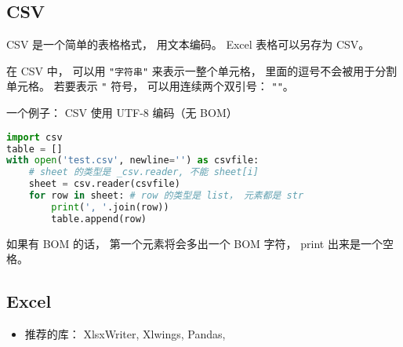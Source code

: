 
\begin{issues}
\issueDraft
\end{issues}


\subsection{CSV}
CSV 是一个简单的表格格式， 用文本编码。 Excel 表格可以另存为 CSV。

在 CSV 中， 可以用 \verb`"字符串"` 来表示一整个单元格， 里面的逗号不会被用于分割单元格。 若要表示 \verb`"` 符号， 可以用连续两个双引号： \verb`""`。

一个例子： CSV 使用 UTF-8 编码（无 BOM）
\begin{lstlisting}[language=python]
import csv
table = []
with open('test.csv', newline='') as csvfile:
    # sheet 的类型是 _csv.reader, 不能 sheet[i]
    sheet = csv.reader(csvfile)
    for row in sheet: # row 的类型是 list， 元素都是 str
        print(', '.join(row))
        table.append(row)
\end{lstlisting}
如果有 BOM 的话， 第一个元素将会多出一个 BOM 字符， print 出来是一个空格。

\subsection{Excel}
\begin{itemize}
\item 推荐的库： XlsxWriter, Xlwings, Pandas, 
\end{itemize}
